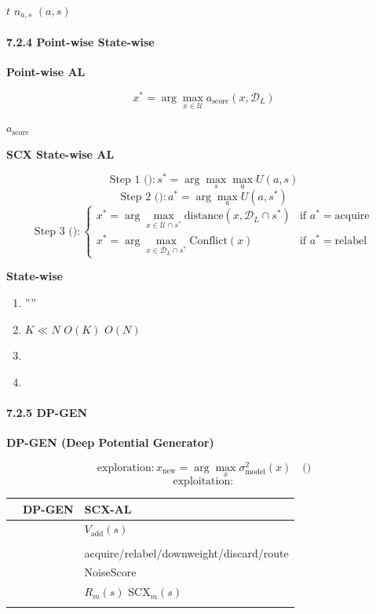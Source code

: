 \documentclass[
  12pt,
]{article}
\providecommand{\tightlist}{%
  \setlength{\itemsep}{0pt}\setlength{\parskip}{0pt}}
\begin{document}
 \(t\) \(n_{a,s}\)  \((a,s)\) 

\paragraph{7.2.4  Point-wise  State-wise
}\label{ux4ece-point-wise-ux5230-state-wise-ux7684ux5347ux7ea7}

\textbf{ Point-wise AL}

\[
x^* = \arg\max_{x \in \mathcal{U}} a_{\text{score}}(x, \mathcal{D}_L)
\]

 \(a_{\text{score}}\) 

\textbf{SCX State-wise AL}

\[
\text{Step 1 ()}: s^* = \arg\max_s \max_a U(a,s)
\] \[
\text{Step 2 ()}: a^* = \arg\max_a U(a, s^*)
\] \[
\text{Step 3 ()}: 
\begin{cases}
x^* = \arg\max_{x \in \mathcal{U} \cap s^*} \text{distance}(x, \mathcal{D}_L \cap s^*) & \text{if } a^* = \text{acquire} \\
x^* = \arg\max_{x \in \mathcal{D}_L \cap s^*} \text{Conflict}(x) & \text{if } a^* = \text{relabel}
\end{cases}
\]

\textbf{ State-wise}

\begin{enumerate}
\def\labelenumi{\arabic{enumi}.}
\tightlist
\item
  \textbf{}''''
\item
  \textbf{} \(K \ll N\) \(O(K)\) 
  \(O(N)\)
\item
  \textbf{}
\item
  \textbf{}
\end{enumerate}

\paragraph{7.2.5  DP-GEN
}\label{ux4e0e-dp-gen-ux7684ux5bf9ux6bd4}

\textbf{DP-GEN (Deep Potential Generator)}

\[
\text{exploration}: x_{\text{new}} = \arg\max_x \sigma^2_{\text{model}}(x) \quad \text{()}
\] \[
\text{exploitation}: \text{}
\]

\textbf{}

\begin{longtable}[]{@{}lll@{}}
\toprule\noalign{}
 & DP-GEN & SCX-AL \\
\midrule\noalign{}
\endhead
\bottomrule\noalign{}
\endlastfoot
 &  & \(V_{\text{add}}(s)\)  \\
 &  &  \\
 &  & acquire/relabel/downweight/discard/route \\
 &  &  NoiseScore  \\
 &  &  \(R_m(s)\)  \(\text{SCX}_m(s)\) \\
 &  &  \\
\end{longtable}
\end{document}
